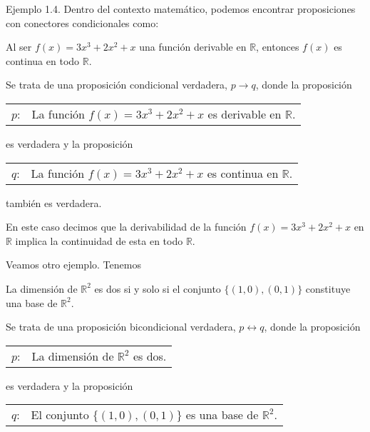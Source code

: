 Ejemplo 1.4. Dentro del contexto matemático, podemos encontrar proposiciones
con conectores condicionales como:

\begin{center}
  Al ser $f(x) = 3x^3 + 2x^2 + x$ una función derivable en $\mathbb{R}$,
  entonces $f(x)$ es continua en todo $\mathbb{R}$.
\end{center}

Se trata de una proposición condicional verdadera, $p \rightarrow q$, donde
la proposición

\begin{center}
\begin{tabular}{ll}
  $p$: & La función $f(x) = 3x^3 + 2x^2 + x$ es derivable en $\mathbb{R}$.
\end{tabular}
\end{center}

\noindent es verdadera y la proposición

\begin{center}
\begin{tabular}{ll}
  $q$: & La función $f(x) = 3x^3 + 2x^2 + x$ es continua en $\mathbb{R}$.
\end{tabular}
\end{center}

\noindent también es verdadera.

En este caso decimos que la derivabilidad de la función $f(x) = 3x^3 + 2x^2
+ x$ en $ \mathbb{R} $ implica la continuidad de esta en todo $\mathbb{R}$.

Veamos otro ejemplo. Tenemos

\begin{center}
  La dimensión de $\mathbb{R}^2$ es dos si y solo si el conjunto $\{(1, 0),
  (0, 1)\}$ constituye una base de $\mathbb{R}^2$.
\end{center}

\noindent Se trata de una proposición bicondicional verdadera, $p
\leftrightarrow q$, donde la proposición

\begin{center}
\begin{tabular}{ll}
  $p$: & La dimensión de $\mathbb{R}^2$ es dos.
\end{tabular}
\end{center}

\noindent es verdadera y la proposición

\begin{center}
\begin{tabular}{ll}
  $q$: & El conjunto $\{(1, 0), (0, 1)\}$ es una base de $\mathbb{R}^2$.
\end{tabular}
\end{center}

